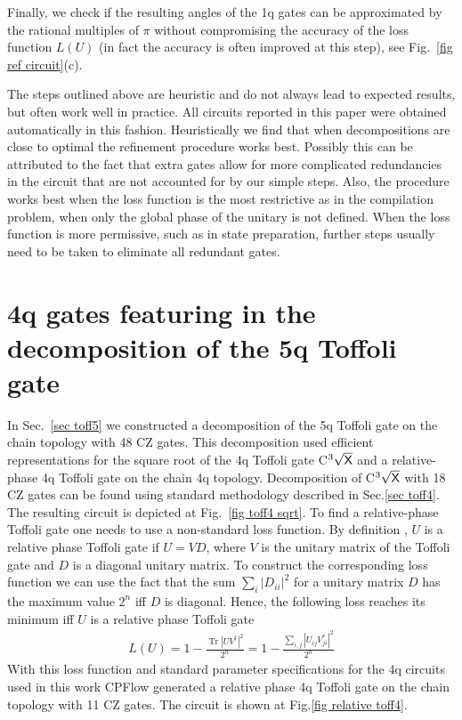 \documentclass[twocolumn, amsfonts, amssymb, aps, nofootinbib]{revtex4-2}
\newcommand{\CZ}{\textsf{CZ }}
\newcommand{\package}[1]{\textrm {#1 }}
\newcommand{\cpflow}{\package{CPFlow}}
\begin{document}
Finally, we check if the resulting angles of the 1q gates can be approximated by the rational multiples of $\pi$ without compromising the accuracy of the loss function $L(U)$ (in fact the accuracy is often improved at this step), see Fig.~\ref{fig ref circuit}(c).

The steps outlined above are heuristic and do not always lead to expected results, but often work well in practice. All circuits reported in this paper were obtained automatically in this fashion. Heuristically we find that when decompositions are close to optimal the refinement procedure works best. Possibly this can be attributed to the fact that extra gates allow for more complicated redundancies in the circuit that are not accounted for by our simple steps. Also, the procedure works best when the loss function is the most restrictive as in the compilation problem, when only the global phase of the unitary is not defined. When the loss function is more permissive, such as in state preparation, further steps usually need to be taken to eliminate all redundant gates.

\section{4q gates featuring in the decomposition of the 5q Toffoli gate \label{app 5q}}
In Sec.~\ref{sec toff5} we constructed a decomposition of the 5q Toffoli gate on the chain topology with 48 \CZ gates. This decomposition used efficient representations for the square root of the 4q Toffoli gate \textsf{C}${}^3\sqrt{\text{\textsf{X}}}$ and a relative-phase 4q Toffoli gate on the chain 4q topology. Decomposition of \textsf{C}${}^3\sqrt{\text{\textsf{X}}}$ with 18 \CZ gates can be found using standard methodology described in Sec.\ref{sec toff4}. The resulting circuit is depicted at Fig.~\ref{fig toff4 sqrt}. To find a relative-phase Toffoli gate one needs to use a non-standard loss function. By definition \cite{Maslov}, $U$ is a relative phase Toffoli gate if $U=VD$, where $V$ is the unitary matrix of the Toffoli gate and $D$ is a diagonal unitary matrix. To construct the corresponding loss function we can use the fact that the sum $\sum_i|D_{ii}|^2$ for a unitary matrix $D$ has the maximum value $2^n$ iff $D$ is diagonal. Hence, the following loss reaches its minimum iff $U$ is a relative phase Toffoli gate
\begin{align}
L(U)=1-\frac{\operatorname{Tr}\left|UV^\dagger\right|^2}{2^n}=1-\frac{\sum_{i, j}\left|U_{ij}V^*_{ji}\right|^2}{2^n}
\end{align}
With this loss function and standard parameter specifications for the 4q circuits used in this work \cpflow generated a relative phase 4q Toffoli gate on the chain topology with 11 \CZ gates. The circuit is shown at Fig.\ref{fig relative toff4}.


\end{document}
